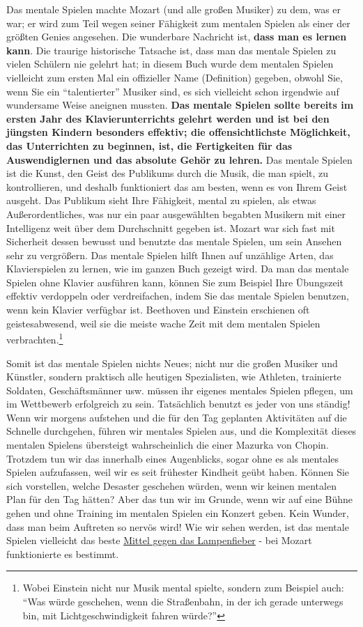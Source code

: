 Das mentale Spielen machte Mozart (und alle großen Musiker) zu dem, was er war; er wird zum Teil wegen seiner Fähigkeit zum mentalen Spielen als einer der größten Genies angesehen.
Die wunderbare Nachricht ist, \textbf{dass man es lernen kann}.
Die traurige historische Tatsache ist, dass man das mentale Spielen zu vielen Schülern nie gelehrt hat;
in diesem Buch wurde dem mentalen Spielen vielleicht zum ersten Mal ein offizieller Name (Definition) gegeben, obwohl Sie, wenn Sie ein \enquote{talentierter} Musiker sind, es sich vielleicht schon irgendwie auf wundersame Weise aneignen mussten.
\textbf{Das mentale Spielen sollte bereits im ersten Jahr des Klavierunterrichts gelehrt werden und ist bei den jüngsten Kindern besonders effektiv;
die offensichtlichste Möglichkeit, das Unterrichten zu beginnen, ist, die Fertigkeiten für das Auswendiglernen und das absolute Gehör zu lehren.}
Das mentale Spielen ist die Kunst, den Geist des Publikums durch die Musik, die man spielt, zu kontrollieren, und deshalb funktioniert das am besten, wenn es von Ihrem Geist ausgeht.
Das Publikum sieht Ihre Fähigkeit, mental zu spielen, als etwas 
Außerordentliches, was nur ein paar ausgewählten begabten Musikern mit einer Intelligenz weit über dem Durchschnitt gegeben ist.
Mozart war sich fast mit Sicherheit dessen bewusst und benutzte das mentale Spielen, um sein Ansehen sehr zu vergrößern.
Das mentale Spielen hilft Ihnen auf unzählige Arten, das Klavierspielen zu lernen, wie im ganzen Buch gezeigt wird.
Da man das mentale Spielen ohne Klavier ausführen kann, können Sie zum Beispiel Ihre Übungszeit effektiv verdoppeln oder verdreifachen, 
indem Sie das mentale Spielen benutzen, wenn kein Klavier verfügbar ist.
Beethoven und Einstein erschienen oft geistesabwesend, weil sie die meiste wache Zeit mit dem mentalen Spielen verbrachten.\footnote{Wobei Einstein nicht nur Musik mental spielte, sondern zum Beispiel auch: \enquote{Was würde geschehen, wenn die Straßenbahn, in der ich gerade unterwegs bin, mit Lichtgeschwindigkeit fahren würde?}}

Somit ist das mentale Spielen nichts Neues;
nicht nur die großen Musiker und Künstler, sondern praktisch alle heutigen Spezialisten, wie Athleten, trainierte Soldaten, Geschäftsmänner usw. müssen ihr eigenes mentales Spielen pflegen, um im Wettbewerb erfolgreich zu sein.
Tatsächlich benutzt es jeder von uns ständig!
Wenn wir morgens aufstehen und die für den Tag geplanten Aktivitäten auf die Schnelle durchgehen, führen wir mentales Spielen aus, und die Komplexität dieses mentalen Spielens übersteigt wahrscheinlich die einer Mazurka von Chopin.
Trotzdem tun wir das innerhalb eines Augenblicks, sogar ohne es als mentales Spielen aufzufassen, weil wir es seit frühester Kindheit geübt haben.
Können Sie sich vorstellen, welche Desaster geschehen würden, wenn wir keinen mentalen Plan für den Tag hätten?
Aber das tun wir im Grunde, wenn wir auf eine Bühne gehen und ohne Training im mentalen Spielen ein Konzert geben.
Kein Wunder, dass man beim Auftreten so nervös wird!
Wie wir sehen werden, ist das mentale Spielen vielleicht das beste \hyperref[c1iii15]{Mittel gegen das Lampenfieber} - bei Mozart funktionierte es bestimmt.


